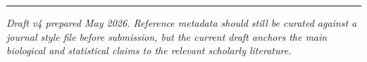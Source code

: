 \documentclass[11pt]{article}
\begin{document}
\vspace{1em}
\begin{center}
\rule{0.4\textwidth}{0.4pt}
\end{center}
\vspace{0.3em}
\noindent\textit{Draft v4 prepared May 2026. Reference metadata should still be curated against a journal style file before submission, but the current draft anchors the main biological and statistical claims to the relevant scholarly literature.}
\end{document}
